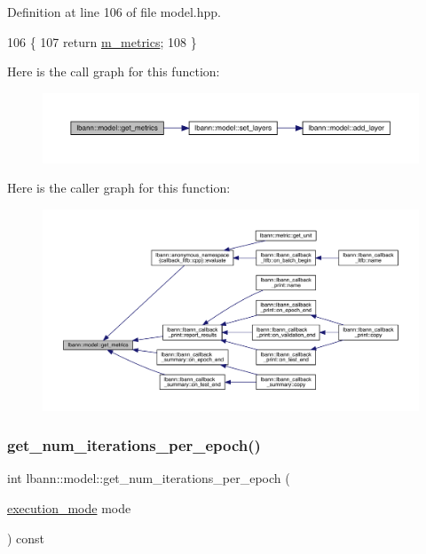 Definition at line 106 of file model.\+hpp.


\begin{DoxyCode}
106                                                          \{
107     \textcolor{keywordflow}{return} \hyperlink{classlbann_1_1model_ae75c9aafe9e5a93980cc1bbae986bc79}{m\_metrics};
108   \}
\end{DoxyCode}
Here is the call graph for this function\+:\nopagebreak
\begin{figure}[H]
\begin{center}
\leavevmode
\includegraphics[width=350pt]{classlbann_1_1model_a84c738fd219b8c2936e76a9360f68936_cgraph}
\end{center}
\end{figure}
Here is the caller graph for this function\+:\nopagebreak
\begin{figure}[H]
\begin{center}
\leavevmode
\includegraphics[width=350pt]{classlbann_1_1model_a84c738fd219b8c2936e76a9360f68936_icgraph}
\end{center}
\end{figure}
\mbox{\label{classlbann_1_1model_a32a189033b8ff92d233781b1039c70f1}} 
\subsubsection{\texorpdfstring{get\+\_\+num\+\_\+iterations\+\_\+per\+\_\+epoch()}{get\_num\_iterations\_per\_epoch()}}
{\footnotesize\ttfamily int lbann\+::model\+::get\+\_\+num\+\_\+iterations\+\_\+per\+\_\+epoch (\begin{DoxyParamCaption}\item[{\hyperlink{base_8hpp_a2781a159088df64ed7d47cc91c4dc0a8}{execution\+\_\+mode}}]{mode }\end{DoxyParamCaption}) const}



